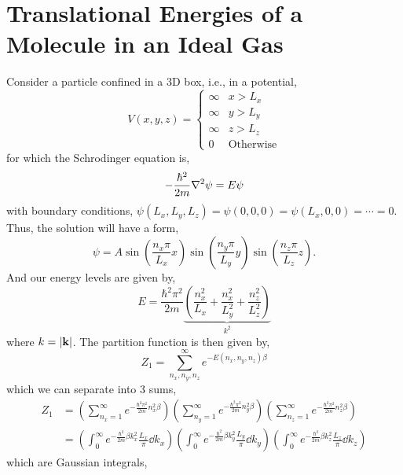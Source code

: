 \documentclass{book}
\begin{document}
\section{Translational Energies of a Molecule in an Ideal Gas}
Consider a particle confined in a 3D box, i.e., in a potential,
\begin{equation}
	V(x,y,z) = \begin{cases}
		\infty &x > L_x \\
		\infty &y > L_y \\
		\infty &z > L_z \\
		0  & \text{Otherwise}
	\end{cases}
\end{equation}
for which the Schrodinger equation is,
\begin{equation}
	-\frac{\hbar^2}{2m}\laplacian{\psi} = E\psi
\end{equation}
with boundary conditions, $\psi(L_x,L_y,L_z) = \psi(0,0,0) = \psi(L_x,0,0) = \cdots = 0$. Thus, the solution will have a form,
\begin{equation}
	\psi = A\sin\left(\frac{n_x\pi}{L_x}x\right)\sin\left(\frac{n_y\pi}{L_y}y\right)\sin\left(\frac{n_z\pi}{L_z}z\right).
\end{equation}
And our energy levels are given by,
\begin{equation}
	E = \frac{\hbar^2 \pi^2}{2m}\underbrace{\left(\frac{n_x^2}{L_x} + \frac{n_x^2}{L_y^2} + \frac{n_z^2}{L_z^2}\right)}_{k^2}
\end{equation}
where $k = \abs{\vb{k}}$. The partition function is then given by,
\begin{equation}
	Z_1 = \sum_{n_x,n_y,n_z}^{\infty} e^{-E(n_x,n_y,n_z)\beta}
\end{equation}
which we can separate into 3 sums,
\begin{equation}
	\begin{split}
	Z_1 & = \left(\sum_{n_x=1}^{\infty} e^{-\frac{\hbar^2\pi^2}{2m}n_x^2\beta}\right)\left(\sum_{n_y=1}^{\infty} e^{-\frac{\hbar^2\pi^2}{2m}n_y^2\beta}\right)\left(\sum_{n_z=1}^{\infty} e^{-\frac{\hbar^2\pi^2}{2m}n_z^2\beta}\right)\\
	& = \left(\int_0^{\infty}e^{-\frac{\hbar^2}{2m}\beta k_x^2}\frac{L_x}{\pi}\dd{k_x}\right)\left(\int_0^{\infty}e^{-\frac{\hbar^2}{2m}\beta k_y^2}\frac{L_y}{\pi}\dd{k_y}\right)\left(\int_0^{\infty}e^{-\frac{\hbar^2}{2m}\beta k_z^2}\frac{L_z}{\pi}\dd{k_z}\right)
	\end{split}
\end{equation}
which are Gaussian integrals,
\end{document}
